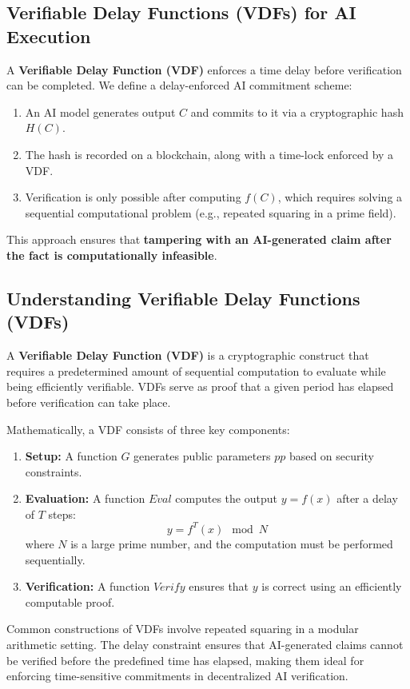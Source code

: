\documentclass[12pt]{report}
\begin{document}
\subsection{Verifiable Delay Functions (VDFs) for AI Execution}

A \textbf{Verifiable Delay Function (VDF)} enforces a time delay before verification can be completed. We define a delay-enforced AI commitment scheme:
\begin{enumerate}
    \item An AI model generates output \( C \) and commits to it via a cryptographic hash \( H(C) \).
    \item The hash is recorded on a blockchain, along with a time-lock enforced by a VDF.
    \item Verification is only possible after computing \( f(C) \), which requires solving a sequential computational problem (e.g., repeated squaring in a prime field).
\end{enumerate}
This approach ensures that \textbf{tampering with an AI-generated claim after the fact is computationally infeasible}.

\subsection{Understanding Verifiable Delay Functions (VDFs)}

A \textbf{Verifiable Delay Function (VDF)} is a cryptographic construct that requires a predetermined amount of sequential computation to evaluate while being efficiently verifiable. VDFs serve as proof that a given period has elapsed before verification can take place.

Mathematically, a VDF consists of three key components:
\begin{enumerate}
    \item \textbf{Setup:} A function \( G \) generates public parameters \( pp \) based on security constraints.
    \item \textbf{Evaluation:} A function \( Eval \) computes the output \( y = f(x) \) after a delay of \( T \) steps:
    \[
    y = f^T(x) \mod N
    \]
    where \( N \) is a large prime number, and the computation must be performed sequentially.
    \item \textbf{Verification:} A function \( Verify \) ensures that \( y \) is correct using an efficiently computable proof.
\end{enumerate}
Common constructions of VDFs involve repeated squaring in a modular arithmetic setting. The delay constraint ensures that AI-generated claims cannot be verified before the predefined time has elapsed, making them ideal for enforcing time-sensitive commitments in decentralized AI verification.
\end{document}
